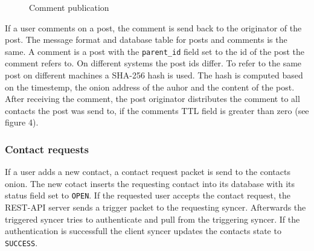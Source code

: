 \documentclass[12pt]{article}
\begin{document}
\begin{figure}[ht]
{
  }\hfill{}
   \caption{Comment publication}
\end{figure}

If a user comments on a post, the comment is send back to the originator of the post.
The message format and database table for posts and comments is the same. A comment is a post with the \texttt{parent\_id} field set to the id
of the post the comment refers to. On different systems the post ids differ. To refer to the same post on different machines a
SHA-256 hash is used. The hash is computed based on the timestemp, the onion address of the auhor and the content of the post.
After receiving the comment, the post originator distributes the comment to all contacts the post was send to, if the comments TTL field is greater
than zero (see figure 4).


\subsubsection{Contact requests}
If a user adds a new contact, a contact request packet is send to the contacts onion.
The new cotact inserts the requesting contact into its database with its status field set to \texttt{OPEN}.
If the requested user accepts the contact request, the REST-API server sends a trigger packet to the requesting syncer.
Afterwards the triggered syncer tries to authenticate and pull from the triggering syncer. If the authentication is successfull the client syncer
updates the contacts state to \texttt{SUCCESS}.
\end{document}
